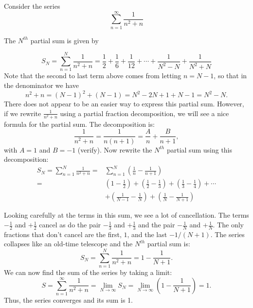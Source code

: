 \documentclass[handout]{ximera}
\begin{document}
\begin{example}[example 1]
Consider the series
\[
\sum_{n=1}^\infty \frac{1}{n^2 +n}
\]

The $N^{th}$ partial sum is given by

\[
S_N = \sum_{n=1}^N \frac{1}{n^2 +n} = \frac{1}{2} + \frac{1}{6} + \frac{1}{12} + \cdots + \frac{1}{N^2 - N} + \frac{1}{N^2 + N}
\]
Note that the second to last term above comes from letting $n = N-1$, so that in the denominator we have 
\[
n^2 + n = (N-1)^2 + (N-1) = N^2 - 2N + 1 + N - 1 = N^2 -N.
\]
There does not appear to be an easier way to express this partial sum.
However, if we rewrite $\frac{1}{n^2 +n}$ using a partial fraction decomposition, we will see a nice formula for the partial sum.
The decomposition is:
\[
\frac{1}{n^2 + n} = \frac{1}{n(n+1)} = \frac{A}{n} + \frac{B}{n+1}, 
\]
with $A = 1$ and $B=-1$ (verify).
Now rewrite the $N^{th}$ partial sum using this decomposition:
\begin{align*}
S_N = \sum_{n=1}^N \frac{1}{n^2 +n} =&\sum_{n=1}^N \left(\frac{1}{n}-\frac{1}{n+1}\right)\\
=& \left(1  - \frac12 \right) + \left(\frac12 - \frac13 \right) + \left(\frac13 - \frac14 \right) + \cdots \\
&+ \left(\frac{1}{N-1} - \frac{1}{N} \right) +\left(\frac{1}{N} - \frac{1}{N+1} \right) 
\end{align*}



Looking carefully at the terms in this sum, we see a lot of cancellation. The terms $-\frac12$ and $+\frac12$ cancel as do the pair
 $-\frac13$ and $+\frac13$ and the pair $-\frac{1}{N}$ and $+\frac{1}{N}$. The only fractions that don't cancel are the first, $1$, and the last $-1/(N+1)$.
 The series collapses like an old-time telescope and the $N^{th}$ partial sum is:
\[
S_N = \sum_{n=1}^N \frac{1}{n^2 +n} = 1 - \frac{1}{N+1}.
\]
We can now find the sum of the series by taking a limit:
\[
S = \sum_{n=1}^\infty  \frac{1}{n^2 +n} = \lim_{N\to \infty} S_N = \lim_{N\to \infty} \left(1 - \frac{1}{N+1}\right) = 1.
\]
Thus, the series converges and its sum is 1.
\end{example}
\end{document}
